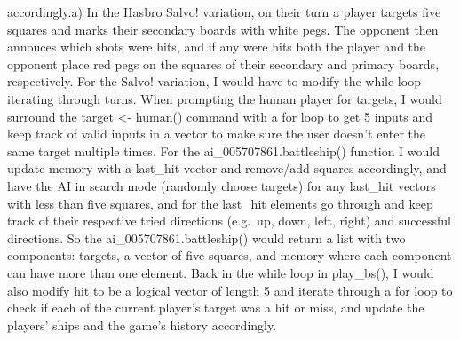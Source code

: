 \documentclass[
]{article}
\begin{document}
{{accordingly.}{a) In the Hasbro Salvo! variation, on their turn a player targets five squares and marks their secondary boards with white pegs. The opponent then annouces which shots were hits, and if any were hits both the player and the opponent place red pegs on the squares of their secondary and primary boards, respectively. For the Salvo! variation, I would have to modify the while loop iterating through turns. When prompting the human player for targets, I would surround the target \textless- human() command with a for loop to get 5 inputs and keep track of valid inputs in a vector to make sure the user doesn't enter the same target multiple times. For the ai\_005707861.battleship() function I would update memory with a last\_hit vector and remove/add squares accordingly, and have the AI in search mode (randomly choose targets) for any last\_hit vectors with less than five squares, and for the last\_hit elements go through and keep track of their respective tried directions (e.g.~up, down, left, right) and successful directions. So the ai\_005707861.battleship() would return a list with two components: targets, a vector of five squares, and memory where each component can have more than one element. Back in the while loop in play\_bs(), I would also modify hit to be a logical vector of length 5 and iterate through a for loop to check if each of the current player's target was a hit or miss, and update the players' ships and the game's history accordingly.}}\label{a-in-the-hasbro-salvo-variation-on-their-turn-a-player-targets-five-squares-and-marks-their-secondary-boards-with-white-pegs.-the-opponent-then-annouces-which-shots-were-hits-and-if-any-were-hits-both-the-player-and-the-opponent-place-red-pegs-on-the-squares-of-their-secondary-and-primary-boards-respectively.-for-the-salvo-variation-i-would-have-to-modify-the-while-loop-iterating-through-turns.-when-prompting-the-human-player-for-targets-i-would-surround-the-target---human-command-with-a-for-loop-to-get-5-inputs-and-keep-track-of-valid-inputs-in-a-vector-to-make-sure-the-user-doesnt-enter-the-same-target-multiple-times.-for-the-ai_005707861.battleship-function-i-would-update-memory-with-a-last_hit-vector-and-removeadd-squares-accordingly-and-have-the-ai-in-search-mode-randomly-choose-targets-for-any-last_hit-vectors-with-less-than-five-squares-and-for-the-last_hit-elements-go-through-and-keep-track-of-their-respective-tried-directions-e.g.-up-down-left-right-and-successful-directions.-so-the-ai_005707861.battleship-would-return-a-list-with-two-components-targets-a-vector-of-five-squares-and-memory-where-each-component-can-have-more-than-one-element.-back-in-the-while-loop-in-play_bs-i-would-also-modify-hit-to-be-a-logical-vector-of-length-5-and-iterate-through-a-for-loop-to-check-if-each-of-the-current-players-target-was-a-hit-or-miss-and-update-the-players-ships-and-the-games-history-accordingly.}
\end{document}
